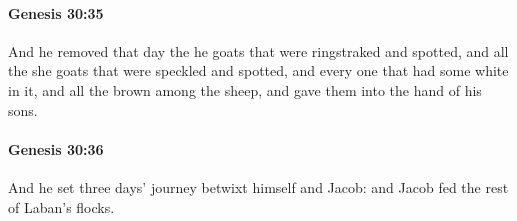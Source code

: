 		\paragraph{Genesis 30:35} %
			\label{GENESIS-30-35}

			And he removed that day the he goats that were ringstraked and spotted, and all the she goats that were speckled and spotted, and every one that had some white in it, and all the brown among the sheep, and gave them into the hand of his sons.


		\paragraph{Genesis 30:36} %
			\label{GENESIS-30-36}

			And he set three days' journey betwixt himself and Jacob: and Jacob fed the rest of Laban's flocks.


